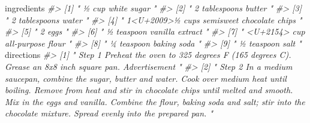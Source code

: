 \documentclass[
  12pt,
]{book}
\newenvironment{Shaded}{\begin{snugshade}}{\end{snugshade}}
\newcommand{\CommentTok}[1]{\textcolor[rgb]{0.37,0.37,0.37}{\textit{#1}}}
\newcommand{\NormalTok}[1]{#1}
\begin{document}
\begin{Shaded}
\begin{Highlighting}[]
\NormalTok{ingredients}
\CommentTok{\#\textgreater{} [1] "                                                ½ cup white sugar                                             "                 }
\CommentTok{\#\textgreater{} [2] "                                                2 tablespoons butter                                             "              }
\CommentTok{\#\textgreater{} [3] "                                                2 tablespoons water                                             "               }
\CommentTok{\#\textgreater{} [4] "                                                1\textless{}U+2009\textgreater{}½ cups semisweet chocolate chips                                             "}
\CommentTok{\#\textgreater{} [5] "                                                2  eggs                                             "                           }
\CommentTok{\#\textgreater{} [6] "                                                ½ teaspoon vanilla extract                                             "        }
\CommentTok{\#\textgreater{} [7] "                                                \textless{}U+2154\textgreater{} cup all{-}purpose flour                                             "    }
\CommentTok{\#\textgreater{} [8] "                                                ¼ teaspoon baking soda                                             "            }
\CommentTok{\#\textgreater{} [9] "                                                ½ teaspoon salt                                             "}
\NormalTok{directions}
\CommentTok{\#\textgreater{} [1] "                                                                                                                                            Step 1                                                                                                                                                                                                                  Preheat the oven to 325 degrees F (165 degrees C). Grease an 8x8 inch square pan.                                                                                                                                                                                                                                                          Advertisement                              "                                                                   }
\CommentTok{\#\textgreater{} [2] "                                                                                                                                            Step 2                                                                                                                                                                                                                  In a medium saucepan, combine the sugar, butter and water. Cook over medium heat until boiling. Remove from heat and stir in chocolate chips until melted and smooth. Mix in the eggs and vanilla. Combine the flour, baking soda and salt; stir into the chocolate mixture. Spread evenly into the prepared pan.                                                                                                                                        "}

\end{Highlighting}
\end{Shaded}
\end{document}
